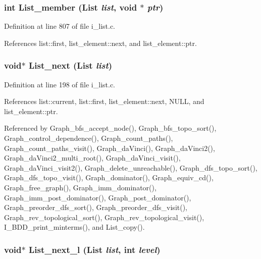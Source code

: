 \subsubsection{\setlength{\rightskip}{0pt plus 5cm}int List\_\-member (\bf{List} {\em list}, void $\ast$ {\em ptr})}\label{i__list_8h_12d4f8ec185eb9574fc29c0cd683132b}




Definition at line 807 of file i\_\-list.c.

References list::first, list\_\-element::next, and list\_\-element::ptr.
\subsubsection{\setlength{\rightskip}{0pt plus 5cm}void$\ast$ List\_\-next (\bf{List} {\em list})}\label{i__list_8h_1bd9d17aaca24a47c41146981c5e05cd}




Definition at line 198 of file i\_\-list.c.

References list::current, list::first, list\_\-element::next, NULL, and list\_\-element::ptr.

Referenced by Graph\_\-bfs\_\-accept\_\-node(), Graph\_\-bfs\_\-topo\_\-sort(), Graph\_\-control\_\-dependence(), Graph\_\-count\_\-paths(), Graph\_\-count\_\-paths\_\-visit(), Graph\_\-da\-Vinci(), Graph\_\-da\-Vinci2(), Graph\_\-da\-Vinci2\_\-multi\_\-root(), Graph\_\-da\-Vinci\_\-visit(), Graph\_\-da\-Vinci\_\-visit2(), Graph\_\-delete\_\-unreachable(), Graph\_\-dfs\_\-topo\_\-sort(), Graph\_\-dfs\_\-topo\_\-visit(), Graph\_\-dominator(), Graph\_\-equiv\_\-cd(), Graph\_\-free\_\-graph(), Graph\_\-imm\_\-dominator(), Graph\_\-imm\_\-post\_\-dominator(), Graph\_\-post\_\-dominator(), Graph\_\-preorder\_\-dfs\_\-sort(), Graph\_\-preorder\_\-dfs\_\-visit(), Graph\_\-rev\_\-topological\_\-sort(), Graph\_\-rev\_\-topological\_\-visit(), I\_\-BDD\_\-print\_\-minterms(), and List\_\-copy().
\subsubsection{\setlength{\rightskip}{0pt plus 5cm}void$\ast$ List\_\-next\_\-l (\bf{List} {\em list}, int {\em level})}\label{i__list_8h_0b78cd5706f1d3cd6650091e59741d8b}




